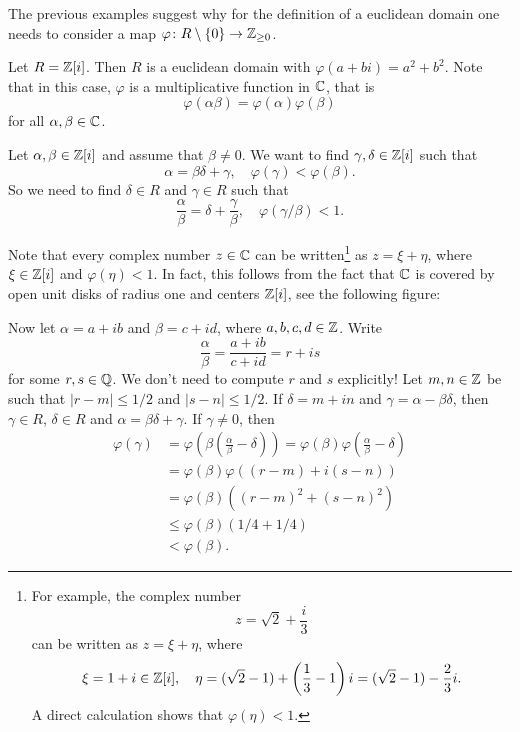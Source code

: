 The previous examples suggest why for the definition of a euclidean domain one needs to  
consider a map $\varphi\colon R\setminus\{0\}\to\mathbb{Z}_{\geq0}$. 

\begin{example}
	Let $R=\mathbb{Z}[i]$. Then $R$ is a euclidean domain with $\varphi(a+bi)=a^2+b^2$. Note that
 in this case, $\varphi$ is a multiplicative function in $\mathbb{C}$, that is
 \[
 \varphi(\alpha\beta)=\varphi(\alpha)\varphi(\beta)
 \]
 for all $\alpha,\beta\in\mathbb{C}$. 
 
 	Let $\alpha,\beta\in\mathbb{Z}[i]$ and assume that $\beta\ne0$. 
	We want to find $\gamma,\delta\in\mathbb{Z}[i]$ such that 
	\[
        \alpha=\beta\delta+\gamma,\quad 
        \varphi(\gamma)<\varphi(\beta).
	\]
    So we need to find $\delta\in R$ and $\gamma\in R$ such that 
    \[
    \frac{\alpha}{\beta}=\delta+\frac{\gamma}{\beta},
    \quad 
    \varphi(\gamma/\beta)<1. 
    \]
    
    Note that every complex
	number $z\in\mathbb{C}$ can be written\footnote{For example, 
    the complex number 
    \[
    z=\sqrt{2}+\frac{i}{3}
    \]
    can be written as 
    $z=\xi+\eta$, where 
    \[
    \xi=1+i\in\mathbb{Z}[i],\quad 
    \eta=(\sqrt{2}-1)+\left(\frac13-1\right)i=(\sqrt{2}-1)-\frac23i. 
    \]
    A direct calculation shows that $\varphi(\eta)<1$.} 
    as $z=\xi+\eta$, where $\xi\in\mathbb{Z}[i]$ and $\varphi(\eta)<1$. In fact, 
    this
	follows from the fact that 
	$\mathbb{C}$ is covered by open unit disks of radius one and 
    centers $\mathbb{Z}[i]$, see the following figure:

	\begin{figure}[ht]
		\centering
\label{fig:covering}
\end{figure}
	
	Now let $\alpha=a+ib$ and $\beta=c+id$, where $a,b,c,d\in\mathbb{Z}$.  
	Write 
	\[
	\frac{\alpha}{\beta}=\frac{a+ib}{c+id}=r+is
	\]
	for some $r,s\in\mathbb{Q}$. We don't need to compute $r$ and $s$ explicitly! 
        Let $m,n\in\mathbb{Z}$ be such that $|r-m|\leq 1/2$ and 
	$|s-n|\leq 1/2$. If $\delta=m+in$ and $\gamma=\alpha-\beta\delta$, then 
	$\gamma\in R$, $\delta\in R$ and $\alpha=\beta\delta+\gamma$. If $\gamma\ne0$, then
	\begin{align*}
	\varphi(\gamma)&=\varphi\left(\beta\left(\frac{\alpha}{\beta}-\delta\right)\right)
	=\varphi(\beta)\varphi\left(\frac{\alpha}{\beta}-\delta\right)\\
	&=\varphi(\beta)\varphi((r-m)+i(s-n))\\
	&=\varphi(\beta)((r-m)^2+(s-n)^2)\\
	&\leq\varphi(\beta)(1/4+1/4)\\
	&<\varphi(\beta).
	\end{align*}	
\end{example}




